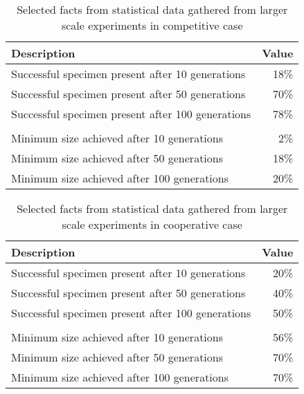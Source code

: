 \begin{table} [H]
    \centering
    \begin{tabular} {l r}
        \hline \hline
        Description & Value \\
        \hline
        Successful specimen present after 10 generations & 18\% \\
        Successful specimen present after 50 generations & 70\% \\
        Successful specimen present after 100 generations & 78\% \\
        \\
        Minimum size achieved after 10 generations & 2\% \\
        Minimum size achieved after 50 generations & 18\% \\
        Minimum size achieved after 100 generations & 20\% \\
    \end{tabular}
    \caption{Selected facts from statistical data gathered from larger scale experiments in competitive case}
    \label{table:x mass_results_comp}
\end{table}

\begin{table} [H]
    \centering
    \begin{tabular} {l r}
        \hline \hline
        Description & Value \\
        \hline
        Successful specimen present after 10 generations & 20\% \\
        Successful specimen present after 50 generations & 40\% \\
        Successful specimen present after 100 generations & 50\% \\
        \\
        Minimum size achieved after 10 generations & 56\% \\
        Minimum size achieved after 50 generations & 70\% \\
        Minimum size achieved after 100 generations & 70\% \\
    \end{tabular}
    \caption{Selected facts from statistical data gathered from larger scale experiments in cooperative case}
    \label{table:x mass_results_coop}
\end{table}

